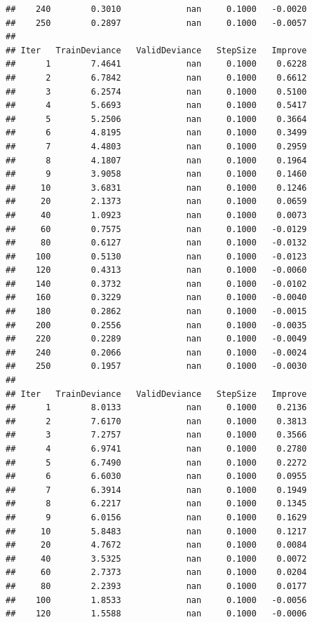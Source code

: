 \documentclass[]{book}
\begin{document}
\begin{verbatim}
##    240        0.3010             nan     0.1000   -0.0020
##    250        0.2897             nan     0.1000   -0.0057
## 
## Iter   TrainDeviance   ValidDeviance   StepSize   Improve
##      1        7.4641             nan     0.1000    0.6228
##      2        6.7842             nan     0.1000    0.6612
##      3        6.2574             nan     0.1000    0.5100
##      4        5.6693             nan     0.1000    0.5417
##      5        5.2506             nan     0.1000    0.3664
##      6        4.8195             nan     0.1000    0.3499
##      7        4.4803             nan     0.1000    0.2959
##      8        4.1807             nan     0.1000    0.1964
##      9        3.9058             nan     0.1000    0.1460
##     10        3.6831             nan     0.1000    0.1246
##     20        2.1373             nan     0.1000    0.0659
##     40        1.0923             nan     0.1000    0.0073
##     60        0.7575             nan     0.1000   -0.0129
##     80        0.6127             nan     0.1000   -0.0132
##    100        0.5130             nan     0.1000   -0.0123
##    120        0.4313             nan     0.1000   -0.0060
##    140        0.3732             nan     0.1000   -0.0102
##    160        0.3229             nan     0.1000   -0.0040
##    180        0.2862             nan     0.1000   -0.0015
##    200        0.2556             nan     0.1000   -0.0035
##    220        0.2289             nan     0.1000   -0.0049
##    240        0.2066             nan     0.1000   -0.0024
##    250        0.1957             nan     0.1000   -0.0030
## 
## Iter   TrainDeviance   ValidDeviance   StepSize   Improve
##      1        8.0133             nan     0.1000    0.2136
##      2        7.6170             nan     0.1000    0.3813
##      3        7.2757             nan     0.1000    0.3566
##      4        6.9741             nan     0.1000    0.2780
##      5        6.7490             nan     0.1000    0.2272
##      6        6.6030             nan     0.1000    0.0955
##      7        6.3914             nan     0.1000    0.1949
##      8        6.2217             nan     0.1000    0.1345
##      9        6.0156             nan     0.1000    0.1629
##     10        5.8483             nan     0.1000    0.1217
##     20        4.7672             nan     0.1000    0.0084
##     40        3.5325             nan     0.1000    0.0072
##     60        2.7373             nan     0.1000    0.0204
##     80        2.2393             nan     0.1000    0.0177
##    100        1.8533             nan     0.1000   -0.0056
##    120        1.5588             nan     0.1000   -0.0006

\end{verbatim}
\end{document}
